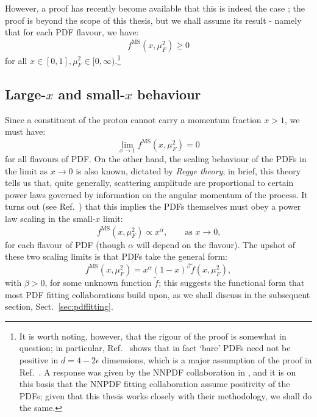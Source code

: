 \documentclass[withindex,glossary]{cam-thesis}
\begin{document}
However, a proof has recently become available that this is indeed the case \cite{Candido:2020yat}; the proof is beyond the scope of this thesis, but we shall assume its result - namely that for each PDF flavour, we have:
\begin{equation}
f^{\overline{\text{MS}}}(x,\mu_F^2) \geq 0
\end{equation}
for all $x \in [0,1], \mu_F^2 \in [0,\infty)$.\footnote{It is worth noting, however, that the rigour of the proof is somewhat in question; in particular, Ref.~\cite{Collins:2021vke} shows that in fact `bare' PDFs need not be positive in $d = 4 - 2\epsilon$ dimensions, which is a major assumption of the proof in Ref.~\cite{Candido:2020yat}. A response was given by the NNPDF collaboration in \cite{Candido:2023ujx}, and it is on this basis that the NNPDF fitting collaboration assume positivity of the PDFs; given that this thesis works closely with their methodology, we shall do the same.}

\subsection{Large-$x$ and small-$x$ behaviour}
\label{sec:pdf_scaling}
Since a constituent of the proton cannot carry a momentum fraction $x > 1$, we must have:
\begin{equation}
\lim_{x \rightarrow 1} f^{\overline{\text{MS}}}(x, \mu_F^2) = 0
\end{equation}
for all flavours of PDF. On the other hand, the scaling behaviour of the PDFs in the limit as $x \rightarrow 0$ is also known, dictated by \textit{Regge theory}; in brief, this theory tells us that, quite generally, scattering amplitude are proportional to certain power laws governed by information on the angular momentum of the process. It turns out (see Ref.~\cite{Abarbanel:1969eh}) that this implies the PDFs themselves must obey a power law scaling in the small-$x$ limit:
\begin{equation}
f^{\overline{\text{MS}}}(x,\mu_F^2) \propto x^{\alpha}, \qquad \text{as $x \rightarrow 0$,}
\end{equation}
for each flavour of PDF (though $\alpha$ will depend on the flavour). The upshot of these two scaling limits is that PDFs take the general form:
\begin{equation}
f^{\overline{\text{MS}}}(x,\mu_F^2) = x^{\alpha} (1-x)^{\beta} \tilde{f}(x,\mu_F^2),
\end{equation}
with $\beta > 0$, for some unknown function $\tilde{f}$; this suggests the functional form that most PDF fitting collaborations build upon, as we shall discuss in the subsequent section, Sect.~\ref{sec:pdffitting}.
\end{document}
